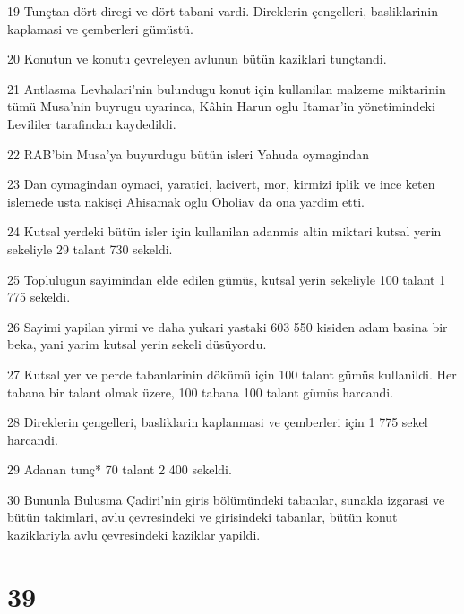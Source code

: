 \par 19 Tunçtan dört diregi ve dört tabani vardi. Direklerin çengelleri, basliklarinin kaplamasi ve çemberleri gümüstü.
\par 20 Konutun ve konutu çevreleyen avlunun bütün kaziklari tunçtandi.
\par 21 Antlasma Levhalari'nin bulundugu konut için kullanilan malzeme miktarinin tümü Musa'nin buyrugu uyarinca, Kâhin Harun oglu Itamar'in yönetimindeki Levililer tarafindan kaydedildi.
\par 22 RAB'bin Musa'ya buyurdugu bütün isleri Yahuda oymagindan
\par 23 Dan oymagindan oymaci, yaratici, lacivert, mor, kirmizi iplik ve ince keten islemede usta nakisçi Ahisamak oglu Oholiav da ona yardim etti.
\par 24 Kutsal yerdeki bütün isler için kullanilan adanmis altin miktari kutsal yerin sekeliyle 29 talant 730 sekeldi.
\par 25 Toplulugun sayimindan elde edilen gümüs, kutsal yerin sekeliyle 100 talant 1 775 sekeldi.
\par 26 Sayimi yapilan yirmi ve daha yukari yastaki 603 550 kisiden adam basina bir beka, yani yarim kutsal yerin sekeli düsüyordu.
\par 27 Kutsal yer ve perde tabanlarinin dökümü için 100 talant gümüs kullanildi. Her tabana bir talant olmak üzere, 100 tabana 100 talant gümüs harcandi.
\par 28 Direklerin çengelleri, basliklarin kaplanmasi ve çemberleri için 1 775 sekel harcandi.
\par 29 Adanan tunç* 70 talant 2 400 sekeldi.
\par 30 Bununla Bulusma Çadiri'nin giris bölümündeki tabanlar, sunakla izgarasi ve bütün takimlari, avlu çevresindeki ve girisindeki tabanlar, bütün konut kaziklariyla avlu çevresindeki kaziklar yapildi.

\chapter{39}

